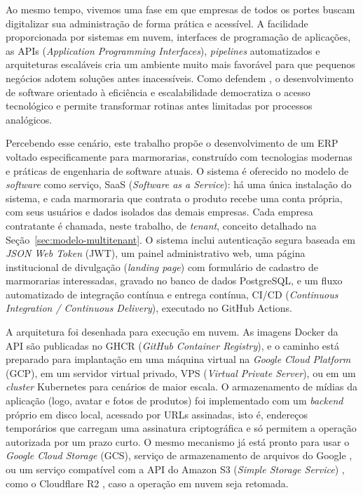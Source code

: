 Ao mesmo tempo, vivemos uma fase em que empresas de todos os portes buscam digitalizar sua administração de forma prática e acessível. A facilidade proporcionada por sistemas em nuvem, interfaces de programação de aplicações, as APIs (\textit{Application Programming Interfaces}), \textit{pipelines} automatizados e arquiteturas escaláveis cria um ambiente muito mais favorável para que pequenos negócios adotem soluções antes inacessíveis. Como defendem , o desenvolvimento de software orientado à eficiência e escalabilidade democratiza o acesso tecnológico e permite transformar rotinas antes limitadas por processos analógicos.

Percebendo esse cenário, este trabalho propõe o desenvolvimento de um ERP voltado especificamente para marmorarias, construído com tecnologias modernas e práticas de engenharia de software atuais. O sistema é oferecido no modelo de \textit{software} como serviço, SaaS (\textit{Software as a Service}): há uma única instalação do sistema, e cada marmoraria que contrata o produto recebe uma conta própria, com seus usuários e dados isolados das demais empresas. Cada empresa contratante é chamada, neste trabalho, de \textit{tenant}, conceito detalhado na Seção~\ref{sec:modelo-multitenant}. O sistema inclui autenticação segura baseada em \textit{JSON Web Token} (JWT), um painel administrativo web, uma página institucional de divulgação (\textit{landing page}) com formulário de cadastro de marmorarias interessadas, gravado no banco de dados PostgreSQL, e um fluxo automatizado de integração contínua e entrega contínua, CI/CD (\textit{Continuous Integration / Continuous Delivery}), executado no GitHub Actions.

A arquitetura foi desenhada para execução em nuvem. As imagens Docker da API são publicadas no GHCR (\textit{GitHub Container Registry}), e o caminho está preparado para implantação em uma máquina virtual na \textit{Google Cloud Platform} (GCP), em um servidor virtual privado, VPS (\textit{Virtual Private Server}), ou em um \textit{cluster} Kubernetes para cenários de maior escala. O armazenamento de mídias da aplicação (logo, avatar e fotos de produtos) foi implementado com um \textit{backend} próprio em disco local, acessado por URLs assinadas, isto é, endereços temporários que carregam uma assinatura criptográfica e só permitem a operação autorizada por um prazo curto. O mesmo mecanismo já está pronto para usar o \textit{Google Cloud Storage} (GCS), serviço de armazenamento de arquivos do Google \cite{gcs-docs}, ou um serviço compatível com a API do Amazon S3 (\textit{Simple Storage Service}) \cite{s3-docs}, como o Cloudflare R2 \cite{r2-docs}, caso a operação em nuvem seja retomada.

